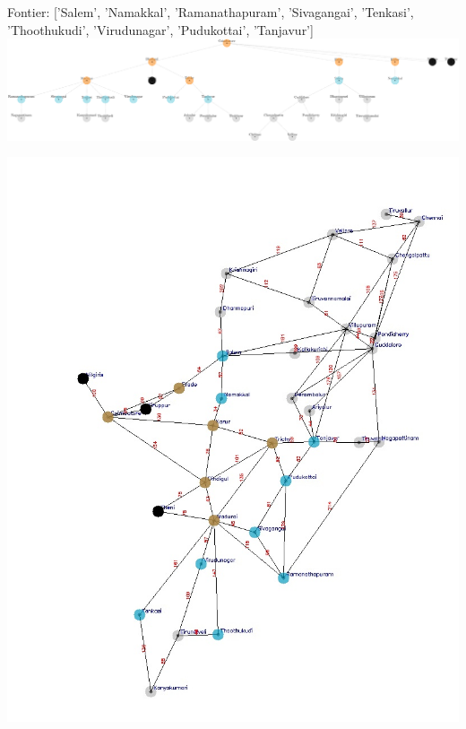 \documentclass[xcolor=table]{beamer}
\begin{document}
\begin{frame}
  { \tiny Fontier: ['Salem', 'Namakkal', 'Ramanathapuram', 'Sivagangai', 'Tenkasi', 'Thoothukudi', 'Virudunagar', 'Pudukottai', 'Tanjavur'] }
  \includegraphics[width=1\textwidth]{../BFSNodes/14-1.png}
  \begin{center}
    \includegraphics[height=0.55\textheight]{../BFSoutput/tamilBFS12.jpg}
  \end{center}
\end{frame}
\end{document}
